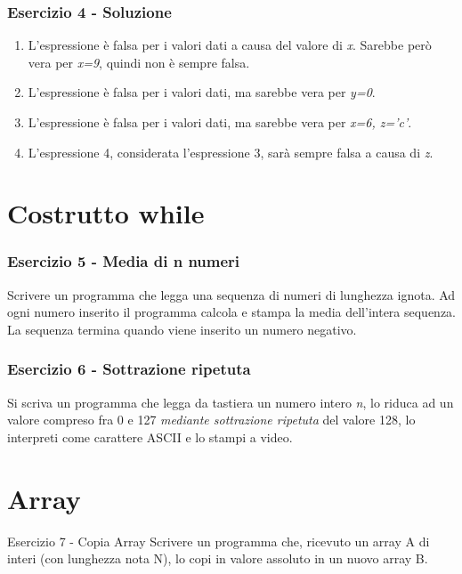 \documentclass{beamer}
\begin{document}
\begin{frame}
\frametitle{Esercizio 4 - Soluzione}
\begin{enumerate}
\item L'espressione è falsa per i valori dati a causa del valore di \emph{x}. Sarebbe però vera per \emph{x=9}, quindi non è sempre falsa.

\item L'espressione è falsa per i valori dati, ma sarebbe vera per \emph{y=0}.

\item L'espressione è falsa per i valori dati, ma sarebbe vera per \emph{x=6, z='c'}.

\item L'espressione 4, considerata l'espressione 3, sarà sempre falsa a causa di \emph{z}.
\end{enumerate}
\end{frame}

\section{Costrutto while}
\begin{frame}
\frametitle{Esercizio 5 - Media di n numeri}
Scrivere un programma che legga una sequenza di numeri di lunghezza ignota. Ad ogni numero inserito il programma calcola e stampa la media dell'intera sequenza. La sequenza termina quando viene inserito un numero negativo.
\end{frame}

\begin{frame}
\frametitle{Esercizio 6 - Sottrazione ripetuta}
Si scriva un programma che legga da tastiera un numero intero \emph{n}, lo riduca ad un valore compreso fra 0 e 127 \emph{mediante sottrazione ripetuta} del valore 128, lo interpreti come carattere ASCII e lo stampi a video.
\end{frame}

\section{Array}
\begin{frame}{Esercizio 7 - Copia Array}
Scrivere un programma che, ricevuto un array A di interi (con lunghezza nota N), lo copi in valore assoluto in un nuovo array B.

\end{frame}
\end{document}

